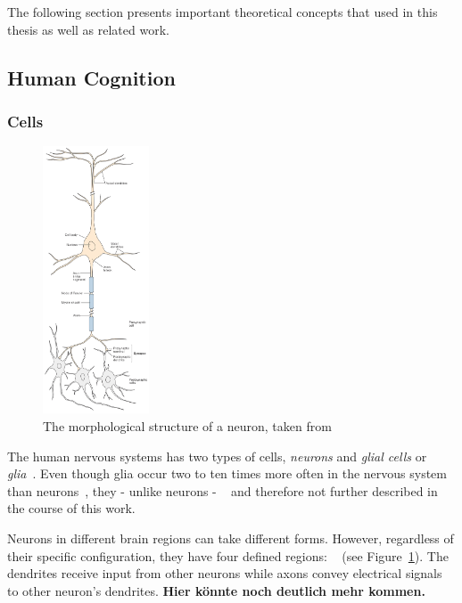 The following section presents important theoretical concepts that used in this thesis as well as related work.

\subsection{Human Cognition}\label{subsec:human-brain-structure}

\subsubsection{Cells}

\begin{figure}
    \begin{center}
        \includegraphics[width=0.28\textwidth]{images/neuron.jpeg}
    \end{center}
    \caption[Neuron structure]{The morphological structure of a neuron, taken from \citet[p. 22]{mack2013principles}}
    \label{fig:neuron_structure}
\end{figure}

The human nervous systems has two types of cells, \textit{neurons} and \textit{glial cells} or \textit{glia}~\citep[p. 71]{mack2013principles}.
Even though glia occur two to ten times more often in the nervous system than neurons~\citep[p. 24]{mack2013principles}, they - unlike neurons - ~\citep[p. 26]{mack2013principles} and therefore not further described in the course of this work.

Neurons in different brain regions can take different forms.
However, regardless of their specific configuration, they have four defined regions: ~\citep[p. 22]{mack2013principles} (see Figure~\ref{fig:neuron_structure}).
The dendrites receive input from other neurons while axons convey electrical signals to other neuron's dendrites.
\textbf{Hier könnte noch deutlich mehr kommen.}

